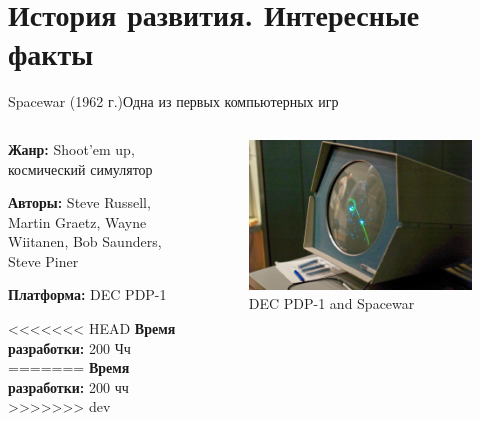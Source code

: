 \documentclass{beamer}
\begin{document}
	\section{История развития. Интересные факты}
	
	\begin{frame}{Spacewar (1962 г.)}{Одна из первых компьютерных игр}
	
	\begin{columns}
		
		\begin{column}{0.5\textwidth}
			
			
			\textbf{Жанр:} Shoot’em up, космический симулятор
			
			\textbf{Авторы:} Steve Russell, Martin Graetz, Wayne Wiitanen, Bob Saunders, Steve Piner
			
			\textbf{Платформа:} DEC PDP-1
			
<<<<<<< HEAD
			\textbf{Время разработки:} 200 Чч
=======
			\textbf{Время разработки:} 200 чч
>>>>>>> dev
			
		\end{column}
		\begin{column}{0.5\textwidth}
			\begin{figure} 
			\includegraphics[width=\textwidth]{images/Spacewar.png}
			\caption {DEC PDP-1 and Spacewar}
			\end{figure}
		\end{column}
		
	\end{columns}
	
\end{frame}
\end{document}
